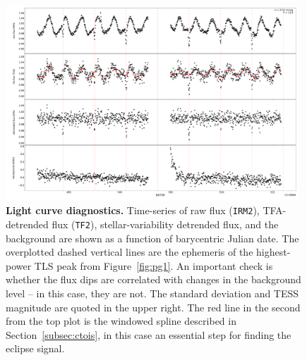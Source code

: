 \documentclass[12pt,twocolumn,tighten]{aastex62}
\begin{document}
\begin{figure}[!h]
	\begin{center}
		\leavevmode
		\includegraphics[width=0.98\textwidth]{gaiatwo0005599752663752776192-0007_page02.pdf}
	\end{center}
	\vspace{-0.5cm}
	\caption{
		{\bf Light curve diagnostics.} 
    Time-series of raw flux (\texttt{IRM2}),  TFA-detrended flux
    (\texttt{TF2}), stellar-variability detrended flux, and the
    background are shown as a function of barycentric Julian date.
    The overplotted dashed vertical lines are the ephemeris of the
    highest-power TLS peak from Figure~\ref{fig:pg1}.
    An important check is whether the flux dips are correlated with
    changes in the background level -- in this case, they are not.
    The standard deviation and TESS magnitude are quoted in the upper
    right.  The red line in the second from the top plot is the
    windowed spline described in Section~\ref{subsec:ctois}, in this
    case an essential step for finding the eclipse signal.
		\label{fig:pg2}
	}
\end{figure}
\end{document}
